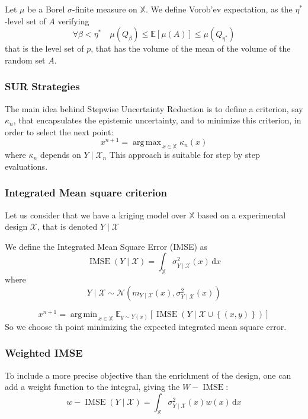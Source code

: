 \documentclass[a4paper,11pt]{article}
\newcommand{\Ex}{\mathbb{E}}
\newcommand{\Xspace}{\mathbb{X}}
\DeclareMathOperator*{\argmin}{arg\,min \,}
\DeclareMathOperator*{\argmax}{arg\,max \,}
\DeclareMathOperator{\IMSE}{IMSE}
\theoremstyle{defi}
\numberwithin{thmCounter}{section}
\begin{document}
Let $\mu$ be a Borel $\sigma$-finite measure on $\Xspace$. We define Vorob'ev expectation, as the $\eta^*$-level set of $A$ verifying
\begin{equation}
  \forall \beta < \eta^* \quad \mu(Q_{\beta}) \leq \Ex[\mu(A)] \leq \mu(Q_{\eta^*})
\end{equation}
that is the level set of $p$, that has the volume of the mean of the volume of the random set $A$.

\subsubsection{SUR Strategies}
The main idea behind Stepwise Uncertainty Reduction is to define a criterion, say $\kappa_n$, that encapsulates the epistemic uncertainty, and to minimize this criterion, in order to select the next point:
\begin{equation}
  x^{n+1} = \argmax_{x\in\Xspace} \kappa_n(x)
\end{equation}
where $\kappa_n$ depends on $Y\mid \mathcal{X}_n$
This approach is suitable for step by step evaluations.

\subsubsection{Integrated Mean square criterion}
\cite{sacks_designs_1989}
Let us consider that we have a kriging model over $\Xspace$ based on a experimental design $\mathcal{X}$, that is denoted $Y \mid \mathcal{X}$

We define the Integrated Mean Square Error (IMSE) as
\begin{equation}
  \IMSE(Y \mid \mathcal{X}) = \int_{\Xspace} \sigma_{Y\mid\mathcal{X}}^2(x)\,\mathrm{d}x
\end{equation}
where
\begin{equation}
  Y\mid \mathcal{X} \sim \mathcal{N}(m_{Y\mid\mathcal{X}}(x),\sigma^2_{Y\mid\mathcal{X}}(x))
\end{equation}


\begin{equation}
  x^{n+1} = \argmin_{x\in \Xspace}\Ex_{y\sim Y(x)}\left[\IMSE\left(Y \mid \mathcal{X}\cup \left\{(x, y)\right\}\right) \right]
\end{equation}
So we choose th point minimizing the expected integrated mean square error.

\subsubsection{Weighted IMSE}
To include a more precise objective than the enrichment of the design, one can add a weight function to the integral, giving the $W-\IMSE$:
\begin{equation}
  \label{eq:w-imse}
  w-\IMSE(Y\mid \mathcal{X}) = \int_{\Xspace} \sigma_{Y\mid\mathcal{X}}^2(x)w(x)\,\mathrm{d}x
\end{equation}
\end{document}
